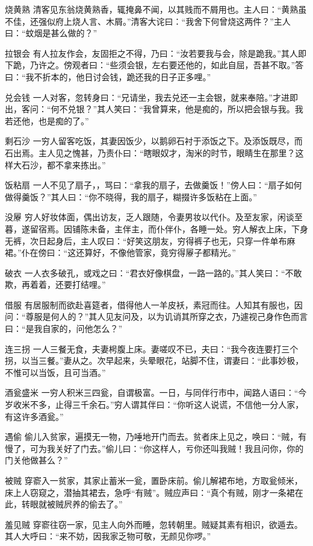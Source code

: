 \documentclass[12pt,UTF8]{ctexbook}
\begin{document}
烧黄熟
清客见东翁烧黄熟香，辄掩鼻不闻，以其贱而不屑用也。主人曰：“黄熟虽不佳，还强似府上烧人言、木屑。”清客大诧曰：“我舍下何曾烧这两件？”主人曰：“蚊烟是甚么做的？”

拉银会
有人拉友作会，友固拒之不得，乃曰：“汝若要我与会，除是跪我。”其人即下跪，乃许之。傍观者曰：“些须会银，左右要还他的，如此自屈，吾甚不取。”答曰：“我不折本的，他日讨会钱，跪还我的日子正多哩。”

兑会钱
一人对客，忽转身曰：“兄请坐，我去兑还一主会银，就来奉陪。”才进即出，客问：“何不兑银？”其人笑曰：“我曾算来，他是痴的，所以把会银与我。我若还他，也是痴的了。”

剩石沙
一穷人留客吃饭，其妻因饭少，以鹅卵石衬于添饭之下。及添饭既尽，而石出焉。主人见之愧甚，乃责仆曰：“瞎眼奴才，淘米的时节，眼睛生在那里？这样大石沙，都不拿来拣出。”

饭粘扇
一人不见了扇子，，骂曰：“拿我的扇子，去做羹饭！”傍人曰：“扇子如何做得羹饭？”其人曰：“你不晓得，我的扇子，糊掇许多饭粘在上面。”

没屪
穷人好妆体面，偶出访友，乏人跟随，令妻男妆以代仆。及至友家，闲谈至暮，遂留宿焉。因铺陈未备，主伴主，而仆伴仆，各睡一处。穷人解衣上床，下身无裤，次日起身后，主人叹曰：“好笑这朋友，穷得裤子也无，只穿一件单布麻裙。”仆在傍曰：“这还算好，不像他管家，竟穷得屪子都精光。”

破衣
一人衣多破孔，或戏之曰：“君衣好像棋盘，一路一路的。”其人笑曰：“不敢欺，再着着，还要打结哩。”

借服
有居服制而欲赴喜筵者，借得他人一羊皮袄，素冠而往。人知其有服也，因问：“尊服是何人的？”其人见友问及，以为讥诮其所穿之衣，乃遽视己身作色而言曰：“是我自家的，问他怎么？”

连三拐
一人三餐无食，夫妻枵腹上床。妻嗟叹不已，夫曰：“我今夜连要打三个拐，以当三餐。”妻从之。次早起来，头晕眼花，站脚不住，谓妻曰：“此事妙极，不惟可以当饭，且可当酒。”

酒瓮盛米
一穷人积米三四瓮，自谓极富。一日，与同伴行市中，闻路人语曰：“今岁收米不多，止得三千余石。”穷人谓其伴曰：“你听这人说谎，不信他一分人家，有这许多酒瓮。”

遇偷
偷儿入贫家，遍摸无一物，乃唾地开门而去。贫者床上见之，唤曰：“贼，有慢了，可为我关好了门去。”偷儿曰：“你这样人，亏你还叫我贼！我且问你，你的门关他做甚么？”

被贼
穿窬入一贫家，其家止蓄米一瓮，置卧床前。偷儿解裙布地，方取瓮倾米，床上人窃窥之，潜抽其裙去，急呼“有贼”。贼应声曰：“真个有贼，刚才一条裙在此，转眼就被贼屄养的偷去了。”

羞见贼
穿窬往窃一家，见主人向外而睡，忽转朝里。贼疑其素有相识，欲遁去。其人大呼曰：“来不妨，因我家乏物可敬，无颜见你啰。”
\end{document}
